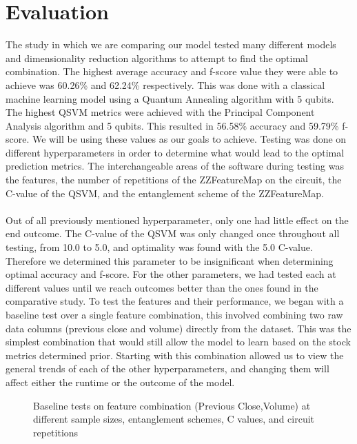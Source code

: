 \documentclass{article}
\begin{document}
\section*{Evaluation}
The study in which we are comparing our model tested many different models and dimensionality reduction algorithms to attempt to find the optimal combination. The highest average accuracy and f-score value they were able to achieve was 60.26\% and 62.24\% respectively. This was done with a classical machine learning model using a Quantum Annealing algorithm with 5 qubits. The highest QSVM metrics were achieved with the Principal Component Analysis algorithm and 5 qubits. This resulted in 56.58\% accuracy and 59.79\% f-score. We will be using these values as our goals to achieve. Testing was done on different hyperparameters in order to determine what would lead to the optimal prediction metrics. The interchangeable areas of the software during testing was the features, the number of repetitions of the ZZFeatureMap on the circuit, the C-value of the QSVM, and the entanglement scheme of the ZZFeatureMap.
\\
\\
Out of all previously mentioned hyperparameter, only one had little effect on the end outcome. The C-value of the QSVM was only changed once throughout all testing, from 10.0 to 5.0, and optimality was found with the 5.0 C-value. Therefore we determined this parameter to be insignificant when determining optimal accuracy and f-score. For the other parameters, we had tested each at different values until we reach outcomes better than the ones found in the comparative study. To test the features and their performance, we began with a baseline test over a single feature combination, this involved combining two raw data columns (previous close and volume) directly from the dataset. This was the simplest combination that would still allow the model to learn based on the stock metrics determined prior. Starting with this combination allowed us to view the general trends of each of the other hyperparameters, and changing them will affect either the runtime or the outcome of the model. 
\begin{figure}[H]
    \centering
    \caption{Baseline tests on feature combination (Previous Close,Volume) at different sample sizes, entanglement schemes, C values, and circuit repetitions}
    \label{fig:5}
\end{figure}
\end{document}
